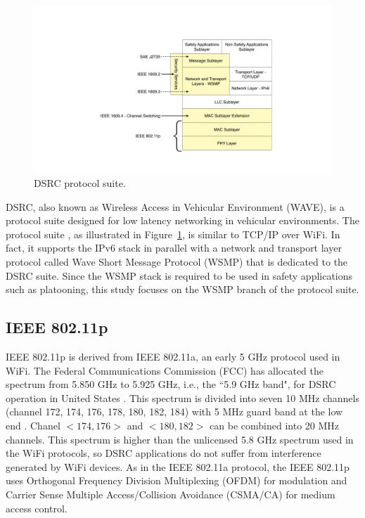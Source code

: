 \documentclass[12pt]{report}
\begin{document}
\begin{figure}[htb]
  \begin{center}
    \includegraphics[width=.7\columnwidth]{figures/dsrc.pdf}
    \caption{\label{fig:dsrc}DSRC protocol suite.}
  \end{center}
\end{figure}

DSRC, also known as Wireless Access in Vehicular Environment (WAVE), is a protocol suite designed for low latency networking in vehicular environments. The protocol suite \cite{kenney2011}, as illustrated in Figure~\ref{fig:dsrc}, is similar to TCP/IP over WiFi. In fact, it supports the IPv6 stack in parallel with a network and transport layer protocol called Wave Short Message Protocol (WSMP) that is dedicated to the DSRC suite. Since the WSMP stack is required to be used in safety applications such as platooning, this study focuses on the WSMP branch of the protocol suite.

\subsection{IEEE 802.11p}
\label{sec:80211p}
IEEE 802.11p is derived from IEEE 802.11a, an early 5 GHz protocol used in WiFi. The Federal Communications Commission (FCC) has allocated the spectrum from 5.850 GHz to 5.925 GHz, i.e., the ``5.9 GHz band", for DSRC operation in United States \cite{fcc59allocation}. This spectrum is divided into seven 10 MHz channels (channel 172, 174, 176, 178, 180, 182, 184) with 5 MHz guard band at the low end \cite{kenney2011}. Chanel $<174, 176>$ and $<180, 182>$ can be combined into 20 MHz channels. This spectrum is higher than the unlicensed 5.8 GHz spectrum used in the WiFi protocols, so DSRC applications do not suffer from interference generated by WiFi devices. As in the IEEE 802.11a protocol, the IEEE 802.11p uses Orthogonal Frequency Division Multiplexing (OFDM) for modulation and Carrier Sense Multiple Access/Collision Avoidance (CSMA/CA) for medium access control.
\end{document}
